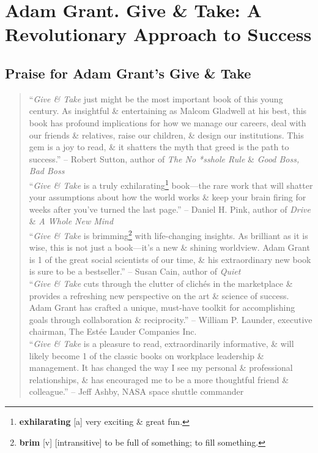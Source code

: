 \documentclass[oneside]{book}
\numberwithin{equation}{section}
\begin{document}

\chapter{Adam Grant. Give \& Take: A Revolutionary Approach to Success}

\section{Praise for Adam Grant's Give \& Take}
\begin{quotation}
	``\textit{Give \& Take} just might be the most important book of this young century. As insightful \& entertaining as Malcom Gladwell at his best, this book has profound implications for how we manage our careers, deal with our friends \& relatives, raise our children, \& design our institutions. This gem is a joy to read, \& it shatters the myth that greed is the path to success.'' -- Robert Sutton, author of \textit{The No *sshole Rule} \& \textit{Good Boss, Bad Boss}\\
	
	``\textit{Give \& Take} is a truly exhilarating\footnote{\textbf{exhilarating} [a] very exciting \& great fun.} book---the rare work that will shatter your assumptions about how the world works \& keep your brain firing for weeks after you've turned the last page.'' -- Daniel H. Pink, author of \textit{Drive} \& \textit{A Whole New Mind}\\
	
	``\textit{Give \& Take} is brimming\footnote{\textbf{brim} [v] [intransitive] to be full of something; to fill something.} with life-changing insights. As brilliant as it is wise, this is not just a book---it's a new \& shining worldview. Adam Grant is 1 of the great social scientists of our time, \& his extraordinary new book is sure to be a bestseller.'' -- Susan Cain, author of \textit{Quiet}\\
	
	``\textit{Give \& Take} cuts through the clutter of clich\'es in the marketplace \& provides a refreshing new perspective on the art \& science of success. Adam Grant has crafted a unique, must-have toolkit for accomplishing goals through collaboration \& reciprocity.'' -- William P. Launder, executive chairman, The Est\'ee Lauder Companies Inc.\\
	
	``\textit{Give \& Take} is a pleasure to read, extraordinarily informative, \& will likely become 1 of the classic books on workplace leadership \& management. It has changed the way I see my personal \& professional relationships, \& has encouraged me to be a more thoughtful friend \& colleague.'' -- Jeff Ashby, NASA space shuttle commander\\
	

\end{quotation}
\end{document}
